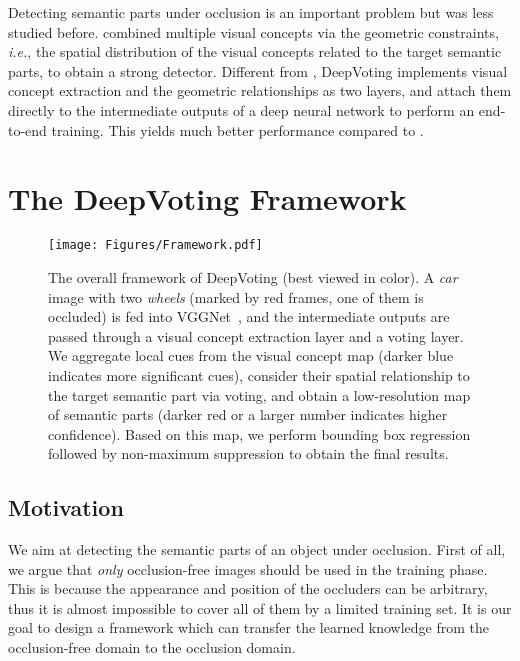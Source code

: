 \documentclass[10pt,twocolumn,letterpaper]{article}
\begin{document}
  Detecting semantic parts under occlusion is an important problem but was less studied before. \cite{wang2017detecting} combined multiple visual concepts via the geometric constraints, {\em i.e.}, the spatial distribution of the visual concepts related to the target semantic parts, to obtain a strong detector. Different from \cite{wang2017detecting}, DeepVoting implements visual concept extraction and the geometric relationships as two layers, and attach them directly to the intermediate outputs of a deep neural network to perform an end-to-end training. This yields much better performance compared to \cite{wang2017detecting}.


  \section{The DeepVoting Framework}
  \label{Framework}

  \begin{figure*}[t!]
  \centering
  \texttt{[image: Figures/Framework.pdf]}
  \caption{
  The overall framework of DeepVoting (best viewed in color). A {\em car} image with two {\em wheels} (marked by red frames, one of them is occluded) is fed into VGGNet~\cite{Simonyan_2015_Very}, and the intermediate outputs are passed through a visual concept extraction layer and a voting layer. We aggregate local cues from the visual concept map (darker blue indicates more significant cues), consider their spatial relationship to the target semantic part via voting, and obtain a low-resolution map of semantic parts (darker red or a larger number indicates higher confidence). Based on this map, we perform bounding box regression followed by non-maximum suppression to obtain the final results.
  }
  \label{Fig:Framework}
  \end{figure*}


  \subsection{Motivation}
  \label{Framework:Motivation}

  We aim at detecting the semantic parts of an object under occlusion. First of all, we argue that {\em only} occlusion-free images should be used in the training phase. This is because the appearance and position of the occluders can be arbitrary, thus it is almost impossible to cover all of them by a limited training set. It is our goal to design a framework which can transfer the learned knowledge from the occlusion-free domain to the occlusion domain.
\end{document}
